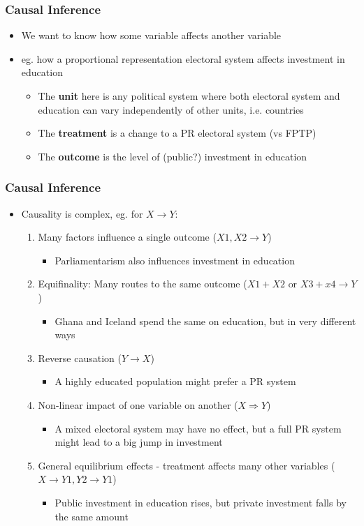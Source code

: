 \documentclass[xcolor=x11names,compress]{beamer}\usepackage[]{graphicx}\usepackage[]{color}
\renewcommand{\(}{\begin{columns}}
\renewcommand{\)}{\end{columns}}
\newcommand{\<}[1]{\begin{column}{#1}}
\renewcommand{\>}{\end{column}}
\begin{document}
\begin{frame}
\frametitle{Causal Inference}
\begin{itemize}
\item We want to know how some variable affects another variable
\item eg. how a proportional representation electoral system affects investment in education
\begin{itemize}
\item The \textbf{unit} here is any political system where both electoral system and education can vary independently of other units, i.e. countries
\item The \textbf{treatment} is a change to a PR electoral system (vs FPTP)
\item The \textbf{outcome} is the level of (public?) investment in education
\end{itemize}
\end{itemize}
\end{frame}

\begin{frame}
\frametitle{Causal Inference}
\begin{itemize}
\item Causality is complex, eg. for $X \rightarrow Y$:
\begin{enumerate}
\item Many factors influence a single outcome ($X1, X2 \rightarrow Y$)
\begin{itemize}
\item Parliamentarism also influences investment in education
\end{itemize}
\item Equifinality: Many routes to the same outcome ($X1+X2 \text{ or } X3+x4 \rightarrow Y$)
\begin{itemize}
\item Ghana and Iceland spend the same on education, but in very different ways
\end{itemize}
\item Reverse causation ($Y \rightarrow X$)
\begin{itemize}
\item A highly educated population might prefer a PR system
\end{itemize}
\item Non-linear impact of one variable on another ($X \Rightarrow Y$)
\begin{itemize}
\item A mixed electoral system may have no effect, but a full PR system might lead to a big jump in investment
\end{itemize}
\item General equilibrium effects - treatment affects many other variables ($X \rightarrow Y1, Y2 \rightarrow Y1$)
\begin{itemize}
\item Public investment in education rises, but private investment falls by the same amount
\end{itemize}
\end{enumerate}
\end{itemize}
\end{frame}
\end{document}
